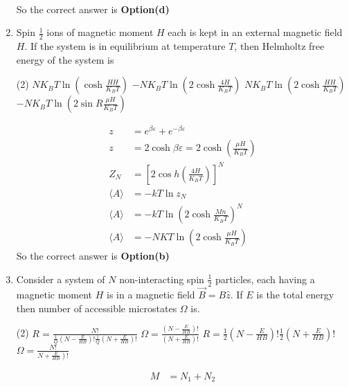 \begin{enumerate}
\begin{answer}
\begin{align*}
	\end{align*}
	So the correct answer is \textbf{Option(d)}
\end{answer}
	\item Spin $\frac{1}{2}$ ions of magnetic moment $H$ each is kept in an external magnetic field $H$. If the system is in equilibrium at temperature $T$, then Helmholtz free energy of the system is 
		\begin{tasks}(2)
			\task[\textbf{a.}]$N K_{B} T \ln \left(\cosh \frac{H H}{K_{B} T}\right)$
			\task[\textbf{b.}]$-N K_{B} T \ln \left(2 \cosh \frac{4 H}{K_{B} T}\right)$
			\task[\textbf{c.}]$N K_{B} T \ln \left(2 \cosh \frac{H H}{K_{B} T}\right)$
			\task[\textbf{d.}] $-N K_{B} T \ln \left(2 \sin R \frac{\mu H}{K_{B} T}\right)$
		\end{tasks}
	\begin{answer}
		\begin{align*}
		z&=e^{\beta \varepsilon}+e^{-\beta \varepsilon}\\
		z&=2 \cosh \beta \varepsilon=2 \cosh \left(\frac{\mu H}{K_{B} T}\right)\\
		Z_{N}&=\left[2 \cos h\left(\frac{4 H}{K_{B} T}\right)\right]^{N}\\
		\langle A\rangle&=-k T \ln z_{N}\\
		\langle A\rangle&=-k T \ln \left(2 \cosh \frac{M n}{K_{B} T}\right)^{N}\\
		\langle A\rangle&=-N K T \ln \left(2 \cosh \frac{\mu H}{K_{B} T}\right)
		\end{align*}
		So the correct answer is \textbf{Option(b)}
	\end{answer}
\item Consider a system of $N$ non-interacting spin $\frac{1}{2}$ particles, each having a magnetic moment $H$ is in a magnetic field $\vec{B}=B \hat{z} $. If $E$ is the total energy then number of accessible microstates $\Omega$ is.
\begin{tasks}(2)
	\task[\textbf{a.}]$R=\frac{N !}{\frac{1}{Q}\left(N-\frac{E}{H B}\right) ! \frac{1}{Q}\left(N+\frac{E}{H B}\right) !}$
	\task[\textbf{b.}]$\Omega=\frac{\left(N-\frac{E}{H B}\right) !}{\left(N+\frac{E}{H B}\right) !}$
	\task[\textbf{c.}]$R=\frac{1}{2}\left(N-\frac{E}{H B}\right) ! \frac{1}{2}\left(N+\frac{E}{H B}\right) !$
	\task[\textbf{d.}] $\Omega=\frac{N !}{\left.N+\frac{E}{H B}\right) !}$
\end{tasks}
\begin{answer}
	\begin{align*}
	M&=N_{1}+N_{2}\\

\end{align*}
\end{answer}
\end{enumerate}
